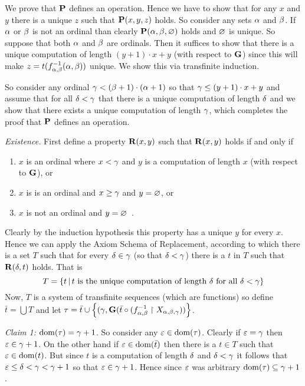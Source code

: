 \begin{solution}
    We prove that $\P$ defines an operation.
    Hence we have to show that  for any $x$ and $y$ there is a unique $z$ such that $\P(x,y,z)$ holds.
    So consider any sets $\a$ and $\b$.
    If $\a$ or $\b$ is not an ordinal than clearly $\P(\a,\b,\es)$ holds and $\es$ is unique.
    So suppose that both $\a$ and $\b$ are ordinals.
    Then it suffices to show that there is a unique computation of length $(y+1)\cdot x + y$ (with respect to $\G$) since this will make $z = t(\inv{f_{\a,\b}}(\a,\b))$ unique.
    We show this via transfinite induction.

    So consider any ordinal $\g < (\b+1) \cdot (\a+1)$ so that $\g \leq (y+1)\cdot x + y$ and assume that for all $\d < \g$ that there is a unique computation of length $\d$ and we show that there exists a unique computation of length $\g$, which completes the proof that $\P$ defines an operation.

    \emph{Existence.} First define a property $\R(x,y)$ such that $\R(x,y)$ holds if and only if
    \begin{enumerate}
        \item $x$ is an ordinal where $x < \g$ and $y$ is a computation of length $x$ (with respect to $\G$), or
        \item $x$ is is an ordinal and $x \geq \g$ and $y = \es$, or
        \item $x$ is not an ordinal and $y = \es$ \,.
    \end{enumerate}
    Clearly by the induction hypothesis this property has a unique $y$ for every $x$.
    Hence we can apply the Axiom Schema of Replacement, according to which there is a set $T$ such that for every $\d \in \g$ (so that $\d < \g$) there is a $t$ in $T$ such that $\R(\d, t)$ holds.
    That is
    $$
    T = \braces{t \where t \text{ is the unique computation of length $\d$ for all $\d < \g$}}
    $$
    Now, $T$ is a system of transfinite sequences (which are functions) so define $\bar{t} = \bigcup T$ and let $\t = \bar{t} \cup \braces{(\g, \G(\bar{t} \circ (\inv{f_{\a,\b}} \rest X_{\a,\b,\g}))}$.

    \emph{Claim 1:} $\dom(\t) = \g+1$.
    So consider any $\e \in \dom(\t)$.
    Clearly if $\e = \g$ then $\e \in \g+1$.
    On the other hand if $\e \in \dom(\bar{t})$ then there is a $t \in T$ such that $\e \in \dom(t)$.
    But since $t$ is a computation of length $\d$ and $\d < \g$ it follows that $\e \leq \d < \g < \g+1$ so that $\e \in \g+1$.
    Hence since $\e$ was arbitrary $\dom(\t) \ss \g+1$.


\end{solution}
